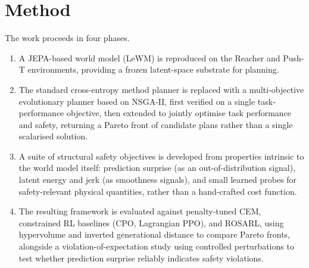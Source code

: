 \documentclass[a4paper,twoside,12pt]{article}
\begin{document}
\section{Method}\label{sec:method}

The work proceeds in four phases.

\begin{enumerate}
    \item A JEPA-based world model (LeWM) is reproduced on the Reacher and Push-T environments, providing a frozen latent-space substrate for planning.

    \item The standard cross-entropy method planner is replaced with a multi-objective evolutionary planner based on NSGA-II, first verified on a single task-performance objective, then extended to jointly optimise task performance and safety, returning a Pareto front of candidate plans rather than a single scalarised solution.

    \item A suite of structural safety objectives is developed from properties intrinsic to the world model itself: prediction surprise (as an out-of-distribution signal), latent energy and jerk (as smoothness signals), and small learned probes for safety-relevant physical quantities, rather than a hand-crafted cost function.

    \item The resulting framework is evaluated against penalty-tuned CEM, constrained RL baselines (CPO, Lagrangian PPO), and ROSARL, using hypervolume and inverted generational distance to compare Pareto fronts, alongside a violation-of-expectation study using controlled perturbations to test whether prediction surprise reliably indicates safety violations.
\end{enumerate}

\end{document}
